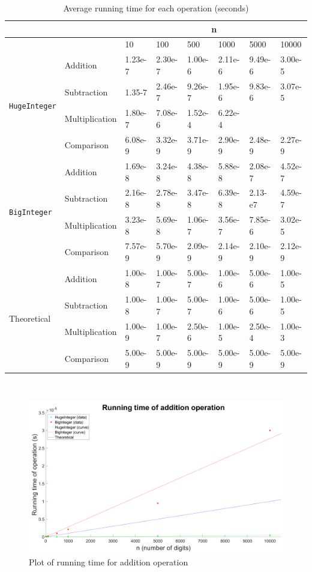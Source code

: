 \documentclass[12pt]{article}
\newcommand{\code}[1]{\texttt{#1}}
\begin{document}
\begin{table}[!h]
    \centering
    \caption{Average running time for each operation (seconds)}
    \begin{tabular}{|l|l|l|l|l|l|l|l|}
        \hline
        & & \multicolumn{6}{|c|}{n} \\ \hline
        & & 10 & 100 & 500 & 1000 & 5000 & 10000 \\ \hline
        \multirow{4}{*}{\code{HugeInteger}} & 
        Addition & 1.23e-7 & 2.30e-7 & 1.00e-6 & 2.11e-6 & 9.49e-6 & 3.00e-5 \\ \cline{2-8}
        & Subtraction & 1.35-7 & 2.46e-7 & 9.26e-7 & 1.95e-6 & 9.83e-6 & 3.07e-5 \\ \cline{2-8}
        & Multiplication & 1.80e-7 & 7.08e-6 & 1.52e-4 & 6.22e-4 &  &  \\ \cline{2-8}
        & Comparison & 6.08e-9 & 3.32e-9 & 3.71e-9 & 2.90e-9 & 2.48e-9 & 2.27e-9 \\ \hline
        \multirow{4}{*}{\code{BigInteger}} & 
        Addition & 1.69e-8 & 3.24e-8 & 4.38e-8 & 5.88e-8 & 2.08e-7 & 4.52e-7 \\ \cline{2-8}
        & Subtraction & 2.16e-8 & 2.78e-8 & 3.47e-8 & 6.39e-8 & 2.13-e7 & 4.59e-7 \\ \cline{2-8}
        & Multiplication & 3.23e-8 & 5.69e-8 & 1.06e-7 & 3.56e-7 & 7.85e-6 & 3.02e-5 \\ \cline{2-8}
        & Comparison & 7.57e-9 & 5.70e-9 & 2.09e-9 & 2.14e-9 & 2.10e-9 & 2.12e-9 \\ \hline
        \multirow{4}{*}{Theoretical} & 
        Addition & 1.00e-8 & 1.00e-7 & 5.00e-7 & 1.00e-6 & 5.00e-6 & 1.00e-5 \\ \cline{2-8}
        & Subtraction & 1.00e-8 & 1.00e-7 & 5.00e-7 & 1.00e-6 & 5.00e-6 & 1.00e-5 \\ \cline{2-8}
        & Multiplication & 1.00e-9 & 1.00e-7 & 2.50e-6 & 1.00e-5 & 2.50e-4 & 1.00e-3 \\ \cline{2-8}
        & Comparison & 5.00e-9 & 5.00e-9 & 5.00e-9 & 5.00e-9 & 5.00e-9 & 5.00e-9 \\ \hline
    \end{tabular}
\end{table} \\
\begin{figure}[h!]
    \centering
    \includegraphics[width=\textwidth]{additionplot.png}
    \caption{Plot of running time for addition operation}
\end{figure}
\end{document}

